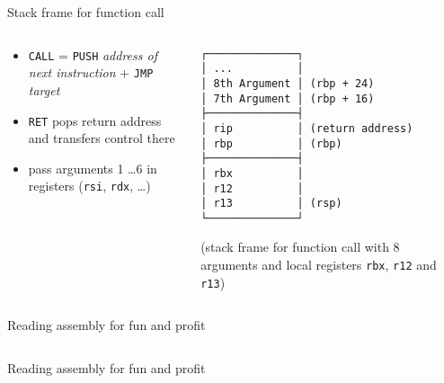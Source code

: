 \begin{frame}[fragile]{Stack frame for function call}
    \begin{columns}
        \begin{column}{.4\textwidth}
            \begin{itemize}
                \item \texttt{CALL} = \texttt{PUSH} \textit{address of next instruction} + \texttt{JMP} \textit{target}
                \item \texttt{RET} pops return address and transfers control there
                \item pass arguments 1 \ldots 6 in registers (\texttt{rsi}, \texttt{rdx}, \ldots)
            \end{itemize}
        \end{column}
        \begin{column}{.6\textwidth}
            \begin{Verbatim}
┌──────────────┐
│ ...          │
│ 8th Argument │ (rbp + 24)
│ 7th Argument │ (rbp + 16)
├──────────────┤
│ rip          │ (return address)
│ rbp          │ (rbp)
├──────────────┤
│ rbx          │
│ r12          │
│ r13          │ (rsp)
└──────────────┘
            \end{Verbatim}
            (stack frame for function call with 8 arguments and local registers \texttt{rbx}, \texttt{r12} and \texttt{r13})
        \end{column}
    \end{columns}
\end{frame}

\begin{frame}[fragile]{Reading assembly for fun and profit}
    \begin{columns}[t]
        \begin{column}{.45\textwidth}
        \end{column}
        \begin{column}{.45\textwidth}
        \end{column}
    \end{columns}
\end{frame}

\begin{frame}[fragile]{Reading assembly for fun and profit}
    \begin{columns}[t]
        \begin{column}{.45\textwidth}
        \end{column}
        \begin{column}{.45\textwidth}
        \end{column}
    \end{columns}
\end{frame}

